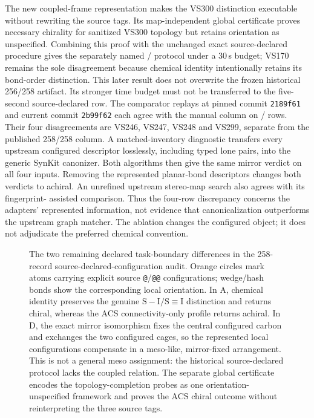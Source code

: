 \documentclass[pdflatex,sn-mathphys-num,referee,lineno]{sn-jnl}
\newcommand{\code}[1]{\texttt{#1}}
\theoremstyle{plain}
\theoremstyle{remark}
\theoremstyle{definition}
\begin{document}
The new coupled-frame representation makes the VS300 distinction executable
without rewriting the source tags.  Its map-independent global certificate
proves necessary chirality for sanitized VS300 topology but retains
orientation as unspecified.  Combining this proof with the unchanged exact
source-declared procedure gives the separately named
\AcsGlobalCorrect/\AcsSourceRecords{} protocol under a 30\,s budget; VS170
remains the sole disagreement because chemical identity intentionally retains
its bond-order distinction.  This later result does not overwrite the frozen
historical 256/258 artifact. Its stronger time budget must not be transferred
to the five-second source-declared row. The comparator replays at pinned commit \code{2189f61} and current
commit \code{2b99f62} each agree with the manual column on
\CurrentSMGCorrect/\AcsSourceRecords{} rows. Their four disagreements are
VS246, VS247, VS248 and VS299, separate from the published 258/258 column.
A matched-inventory diagnostic transfers every upstream configured descriptor
losslessly, including typed lone pairs, into the generic SynKit canonizer.
Both algorithms then give the same mirror verdict on all four inputs. Removing
the represented planar-bond descriptors changes both verdicts to achiral.
An unrefined upstream stereo-map search also agrees with its fingerprint-
assisted comparison. Thus the four-row discrepancy concerns the adapters'
represented information, not evidence that canonicalization outperforms the
upstream graph matcher. The ablation changes the configured object; it does
not adjudicate the preferred chemical convention.

\begin{figure}[htbp]
\centering
\resizebox{0.98\textwidth}{!}{}
\caption{The two remaining declared task-boundary differences in the
258-record source-declared-configuration audit. Orange circles mark atoms carrying
explicit source \code{@}/\code{@@} configurations; wedge/hash bonds show the
corresponding local orientation. In A, chemical identity preserves the genuine
\(\mathrm{S{-}I}/\mathrm{S{\equiv}I}\) distinction and returns chiral, whereas
the ACS connectivity-only profile returns achiral. In D, the exact mirror
isomorphism fixes the central configured carbon and exchanges the two
configured cages, so the represented local configurations compensate in a
meso-like, mirror-fixed arrangement.  This is not a general meso assignment:
the historical source-declared protocol lacks the coupled relation.  The
separate global certificate encodes the topology-completion probes as one
orientation-unspecified framework and proves the ACS chiral outcome without
reinterpreting the three source tags.}
\label{fig:exact-mirror-mismatches}
\end{figure}
\end{document}
